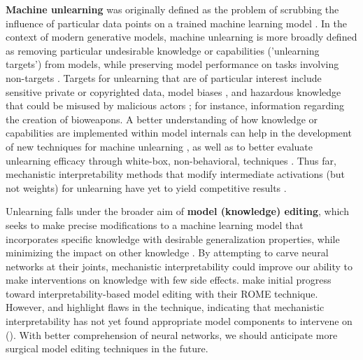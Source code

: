 \textbf{Machine unlearning} was originally defined as the problem of scrubbing the influence of particular data points on a trained machine learning model \citep{Cao_2015_MachineUnlearning}. In the context of modern generative models, machine unlearning is more broadly defined as removing particular undesirable knowledge or capabilities ('unlearning targets') from models, while preserving model performance on tasks involving non-targets \citep{liu2024rethinkingmachineunlearninglarge}. Targets for unlearning that are of particular interest include sensitive private or copyrighted data, model biases \citep{liu2024machineunlearninggenerativeai}, and hazardous knowledge that could be misused by malicious actors \citep{li2024wmdp}; for instance, information regarding the creation of bioweapons. A better understanding of how knowledge or capabilities are implemented within model internals can help in the development of new techniques for machine unlearning \citep{belrose2023leaceperfectlinearconcept,zou2024improvingalignmentrobustnesscircuit, guo2024robust,pochinkov2024dissectinglanguagemodelsmachine, ashuach2024revsunlearningsensitiveinformation}, as well as to better evaluate unlearning efficacy through white-box, non-behavioral, techniques \citep{lynch2024methodsevaluaterobustunlearning,deeb2024unlearningmethodsremoveinformation,hong2024intrinsicevaluationunlearningusing}. Thus far, mechanistic interpretability methods that modify intermediate activations (but not weights) for unlearning have yet to yield competitive results \citep{farrell2024applyingsparseautoencodersunlearn}.

Unlearning falls under the broader aim of \textbf{model (knowledge) editing}, which seeks to make precise modifications to a machine learning model that incorporates specific knowledge with desirable generalization properties, while minimizing the impact on other knowledge \citep{wang2023knowledgeeditinglargelanguage}. By attempting to carve neural networks at their joints, mechanistic interpretability could improve our ability to make interventions on knowledge with few side effects. \citet{meng2023locatingeditingfactualassociations} make initial progress toward interpretability-based model editing with their ROME technique. However, \citet{Thibodeau_2022} and \citet{hase2023doeslocalizationinformediting} highlight flaws in the technique, indicating that mechanistic interpretability has not yet found appropriate model components to intervene on (). With better comprehension of neural networks, we should anticipate more surgical model editing techniques in the future.

